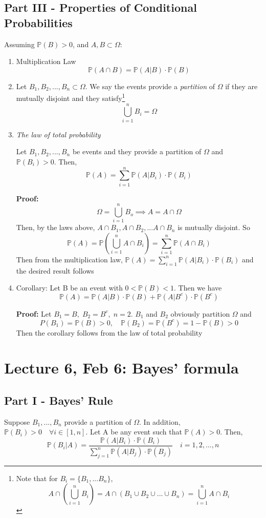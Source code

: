 \documentclass[12pt]{article}
\renewcommand{\P}{\mathbb{P}}
\begin{document}
\subsection*{Part III - Properties of Conditional Probabilities}
Assuming $\P(B) > 0$, and $A, B \subset \Omega$:
\begin{enumerate}
    \item Multiplication Law
    \[\P(A \cap B) = \P(A | B) \cdot \P(B)\]
    
    \item Let $B_1, B_2, ..., B_n \subset \Omega$. We say the events provide a \emph{partition} of $\Omega$ if they are mutually disjoint and they satisfy\footnote{Note that for $B_i = \{B_1, ... B_n\}$, \[A \cap \left(\bigcup_{i=1}^n B_i\right) = A \cap (B_1 \cup B_2 \cup ... \cup B_n) = \bigcup_{i = 1}^n A \cap B_i\]} 
    \[\bigcup_{i=1}^n B_i = \Omega\] 

    \item \emph{The law of total probability }
    
    Let $B_1, B_2, ..., B_n$ be events and they provide a partition of $\Omega$ and $\P(B_i) > 0$. Then, 
    \[\P(A) = \sum_{i=1}^n \P(A | B_i) \cdot \P(B_i)\]

    \textbf{Proof:} 
    \[\Omega = \bigcup_{i=1}^n B_o \implies A = A \cap \Omega\]
    Then, by the laws above, $A \cap B_1, A \cap B_2, ... A \cap B_n$ is mutually disjoint. So 
    \[\P(A) = \P(\bigcup_{i = 1}^n A \cap B_i) = \sum_{i = 1}^n \P(A \cap B_i)\]
    Then from the multiplication law, $\P(A) = \sum_{i=1}^n \P(A | B_i) \cdot \P(B_i)$ and the desired result follows

    \item Corollary: Let B be an event with $0 < \P(B) < 1$. Then we have 
    \[\P(A) = \P(A | B) \cdot \P(B) + \P(A | B^c) \cdot \P(B^c)\]

    \textbf{Proof:}
    Let $B_1 = B, \; B_2 = B^c, \; n = 2$. $B_1$ and $B_2$ obviously partition $\Omega$ and 
    \[P(B_1) = \P(B) > 0, \quad \P(B_2) = \P(B^c) = 1 -\P(B) > 0\]
    Then the corollary follows from the law of total probability 

\end{enumerate}

\section{Lecture 6, Feb 6: Bayes' formula}
\subsection*{Part I - Bayes' Rule}
Suppose $B_1, ..., B_n$ provide a partition of $\Omega$. In addition, $\P(B_i) > 0 \quad \forall i \in [1, n]$. Let A be any event such that $\P(A) > 0$. Then, 
\[\P(B_i | A) = \frac{\P(A | B_i) \cdot \P(B_i)}{\sum_{j=1}^n \P(A | B_j) \cdot \P(B_j)} \quad i = 1, 2, ..., n\]
\end{document}
